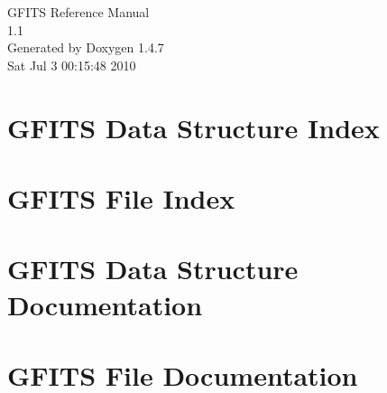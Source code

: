 \documentclass[a4paper]{book}
\begin{document}
\begin{titlepage}
\vspace*{7cm}
\begin{center}
{\Large GFITS Reference Manual\\[1ex]\large 1.1 }\\
\vspace*{1cm}
{\large Generated by Doxygen 1.4.7}\\
\vspace*{0.5cm}
{\small Sat Jul 3 00:15:48 2010}\\
\end{center}
\end{titlepage}
\clearemptydoublepage
{}
\tableofcontents
\clearemptydoublepage
{}
\chapter{GFITS Data Structure Index}

\chapter{GFITS File Index}

\chapter{GFITS Data Structure Documentation}









\chapter{GFITS File Documentation}





































\printindex
\end{document}
